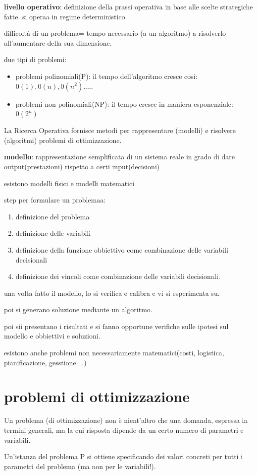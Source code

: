 \documentclass[12pt]{article}
\begin{document}
\textbf{livello operativo}: definizione della prassi operativa in base alle scelte strategiche fatte. si operaa in regime deterministico.

difficoltà di un problema= tempo necessario (a un algoritmo) a risolverlo all'aumentare della sua dimensione.

due tipi di problemi:
\begin{itemize}
\item problemi polinomiali(P): il tempo dell'algoritmo cresce cosi: $0(1),0(n),0(n^2).....$
\item problemi non polinomiali(NP): il tempo cresce in maniera esponenziale:$0(2^n)$
\end{itemize}

La Ricerca Operativa fornisce metodi per
rappresentare (modelli) e risolvere (algoritmi)
problemi di ottimizzazione.

\textbf{modello}: rappresentazione semplificata di un sistema reale in grado di dare output(prestazioni) rispetto a certi input(decisioni)

esistono modelli fisici e modelli matematici

step per formulare un problemaa:
\begin{enumerate}
\item definizione del problema
\item definizione delle variabili
\item definizione della funzione obbiettivo come combinazione delle variabili decisionali
\item definizione dei vincoli come combinazione delle variabili decisionali.
\end{enumerate}

una volta fatto il modello, lo si verifica e calibra e vi si esperimenta su.

poi si generano soluzione mediante un algoritmo.

poi sii presentano i risultati e si fanno opportune verifiche sulle ipotesi sul modello e obbiettivi e soluzioni.

esistono anche problemi non necessariamente matematici(costi, logistica, pianificazione, gesstione....)

\section{problemi di ottimizzazione}

Un problema (di ottimizzazione) non è nient’altro che una domanda,
espressa in termini generali, ma la cui risposta dipende da un certo
numero di parametri e variabili.

Un’istanza del problema P si ottiene specificando dei valori concreti per
tutti i parametri del problema (ma non per le variabili!).
\end{document}
